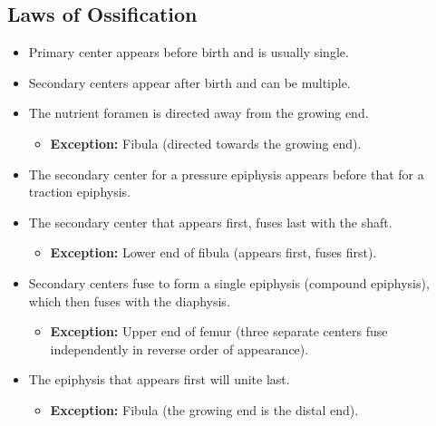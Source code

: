 \documentclass[11pt]{article}
\begin{document}
\subsection{Laws of Ossification}
\begin{itemize}
    \item Primary center appears before birth and is usually single.
    \item Secondary centers appear after birth and can be multiple.
    \item The nutrient foramen is directed away from the growing end.
    \begin{itemize}
        \item \textbf{Exception:} Fibula (directed towards the growing end).
    \end{itemize}
    \item The secondary center for a pressure epiphysis appears before that for a traction epiphysis.
    \item The secondary center that appears first, fuses last with the shaft.
    \begin{itemize}
        \item \textbf{Exception:} Lower end of fibula (appears first, fuses first).
    \end{itemize}
    \item Secondary centers fuse to form a single epiphysis (compound epiphysis), which then fuses with the diaphysis.
    \begin{itemize}
        \item \textbf{Exception:} Upper end of femur (three separate centers fuse independently in reverse order of appearance).
    \end{itemize}
    \item The epiphysis that appears first will unite last.
    \begin{itemize}
        \item \textbf{Exception:} Fibula (the growing end is the distal end).
    \end{itemize}
\end{itemize}

\printbibliography
\end{document}
